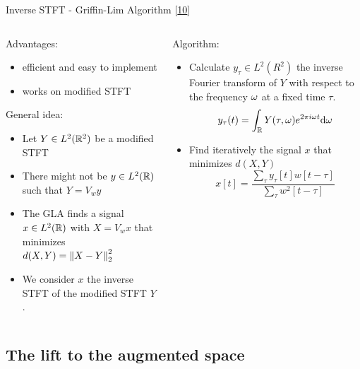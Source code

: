 \documentclass[10pt,american,ignorenonframetext,aspectratio=1610]{beamer}
\providecommand{\tightlist}{%
  \setlength{\itemsep}{0pt}\setlength{\parskip}{0pt}}
\theoremstyle{remark}
\begin{document}
\begin{frame}{Inverse STFT - Griffin-Lim Algorithm
{[}\protect\hyperlink{ref-griffin1983}{10}{]}}
\protect\hypertarget{inverse-stft---griffin-lim-algorithm-griffin1983}{}

\begin{columns}[T]
\begin{column}{0.5\textwidth}
Advantages:

\begin{itemize}
\tightlist
\item
  efficient and easy to implement
\item
  works on modified STFT
\end{itemize}

General idea:

\begin{itemize}
\tightlist
\item
  Let \(Y\in L^2(\mathbb{R}^2)\) be a modified STFT
\item
  There might not be \(y\in L^2(\mathbb{R})\) such that \(Y=V_w y\)
\item
  The GLA finds a signal \(x\in L^2(\mathbb{R})\) with \(X=V_w x\) that
  minimizes \(d(X,Y)=\left\lVert X-Y\right\rVert_2^2\)
\item
  We consider \(x\) the inverse STFT of the modified STFT \(Y\).
\end{itemize}
\end{column}

\begin{column}{0.5\textwidth}
Algorithm:

\begin{itemize}
\tightlist
\item
  Calculate \(y_\tau \in L^2(R^2)\) the inverse Fourier transform of
  \(Y\) with respect to the frequency \(\omega\) at a fixed time \(\tau\).
  \[y_\tau(t) = \int_{\mathbb{R}} Y(\tau,\omega) e^{2\pi i\omega t} \mathrm{d}\omega\]
\item
  Find iteratively the signal \(x\) that minimizes \(d(X,Y)\)
  \[x[t] = \frac{\sum\limits_\tau y_\tau[t]w[t-\tau]}{\sum\limits_\tau w^2[t-\tau]}\]
\end{itemize}
\end{column}
\end{columns}

\end{frame}

\hypertarget{the-lift-to-the-augmented-space}{%
\subsection{The lift to the augmented
space}\label{the-lift-to-the-augmented-space}}
\end{document}
